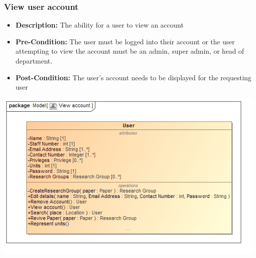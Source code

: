 \documentclass[11pt]{article}
\begin{document}
		\subsubsection{View user account}
		\begin{itemize}
			\item \textbf{Description: }The ability for a user to view an account
			\item \textbf{Pre-Condition: }The user must be logged into their account or the user attempting to view the account must be an admin, super admin, or head of department.
			\item \textbf{Post-Condition: }The user's account needs to be displayed for the requesting user
		\end{itemize}
		\begin{center}
			\includegraphics[width=\textwidth]{../Diagrams/DomainModel/Viewaccount.png}\\[0.5cm]
		\end{center}
		\newpage
\end{document}
